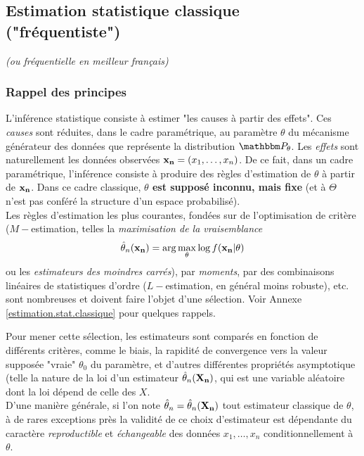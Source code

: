 \subsection{Estimation statistique classique ("fréquentiste")}

{\it (ou \emph{fréquentielle} en meilleur français)}

\subsubsection{Rappel des principes}\label{rappel.principes}

L'inférence statistique consiste à estimer "les causes à partir des effets". Ces \emph{causes} sont réduites, dans le cadre paramétrique, au paramètre $\theta$ du mécanisme générateur des données que représente la distribution $\Pp_{\theta}$. Les \emph{effets} sont naturellement les données observées ${\bf x_n}=(x_1,\ldots,x_n)$. De ce fait, dans un cadre paramétrique, l'inférence consiste à produire des règles d'estimation de $\theta$ à partir de ${\bf x_n}$. Dans ce cadre classique, {\bf $\theta$ est supposé inconnu, mais fixe}  (et à $\Theta$ n'est pas conféré la structure d'un espace probabilisé). \\

Les règles d'estimation les plus courantes, fondées sur de l'optimisation de critère ($M-$estimation, telles la \emph{maximisation de la vraisemblance}
$$
\hat{\theta}_n({\bf x_n})  =  \arg\max\limits_{\theta} \log f({\bf x_n}|\theta)
$$
ou les \emph{estimateurs des moindres carrés}), par \emph{moments}, par des combinaisons linéaires de statistiques d'ordre ($L-$estimation, en général moins robuste), etc. sont nombreuses et doivent faire l'objet d'une sélection. Voir Annexe \ref{estimation.stat.classique} pour quelques rappels.

Pour mener cette sélection, les estimateurs sont comparés en fonction de différents critères, comme le biais, la rapidité de convergence vers la valeur supposée "vraie" $\theta_0$ du paramètre, et d'autres différentes propriétés asymptotique (telle la nature de la loi d'un estimateur $\hat{\theta}_n({\bf X_n})$, qui est une variable aléatoire dont la loi dépend de celle des $X$. \\

D'une manière générale, si l'on note $\hat{\theta}_n=\hat{\theta}_n({\bf X_n})$ tout estimateur classique de $\theta$, à de rares exceptions près la validité de ce choix d'estimateur est dépendante du caractère \emph{reproductible} et \emph{échangeable} des données $x_1,\ldots,x_n$ conditionnellement à $\theta$. 

